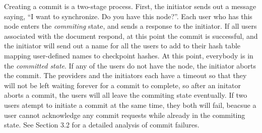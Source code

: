 \documentclass[11pt,titlepage]{article}
\begin{document}
Creating a commit is a two-stage process. First, the initiator sends
out a message saying, ``I want to synchronize. Do you have this
node?''. Each user who has this node enters the \emph{commiting}
state, and sends a response to the initiator. If all users associated
with the document respond, at this point the commit is successful, and
the initiator will send out a name for all the users to add to their
hash table mapping user-defined names to checkpoint hashes. At this
point, everybody is in the \emph{committed state}. If any of the users
do not have the node, the initiator aborts the commit. The providers
and the initiators each have a timeout so that they will not be left
waiting forever for a commit to complete, so after an initator aborts
a commit, the users will all leave the commiting state eventually. If
two users atempt to initiate a commit at the same time, they both will
fail, beacsue a user cannot acknowledge any commit requests while
already in the commiting state. See Section 3.2 %
for a detailed analysis of commit failures.




\end{document}
